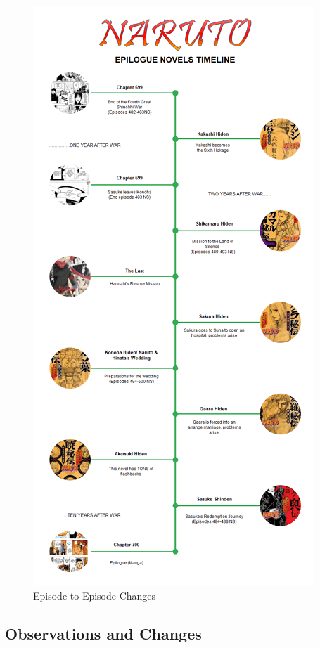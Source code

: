 \documentclass[
  letterpaper,
  DIV=11,
  numbers=noendperiod]{scrartcl}
\begin{document}
\begin{figure}

{\centering \includegraphics{quarto2_files/mediabag/naruto-novel-timelin.png}

}

\caption{Episode-to-Episode Changes}

\end{figure}

\hypertarget{observations-and-changes}{%
\subsection{Observations and Changes}\label{observations-and-changes}}
\end{document}
